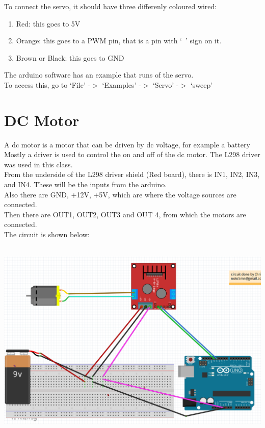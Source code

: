 \documentclass[14pt, oneside]{memoir}
\begin{document}
To connect the servo, it should have three differenly coloured
wired:
\begin{enumerate}
    \item Red: this goes to 5V
    \item Orange: this goes to a PWM pin, that is a pin with `~'
        sign on it.
    \item Brown or Black: this goes to GND
\end{enumerate}

The arduino software has an example that runs of the servo.
\\
To access this, go to `File' -$>$ `Examples' -$>$ `Servo' -$>$
`sweep'
\section*{DC Motor}
A dc motor is a motor that can be driven by dc voltage, for
example a battery
\\
Mostly a driver is used to control the on and off of the dc motor.
The L298 driver was used in this class.
\\
From the underside of the L298 driver shield (Red board), there is
IN1, IN2, IN3, and IN4. These will be the inputs from the arduino.
\\
Also there are GND, +12V, +5V, which are where the voltage sources
are connected.
\\
Then there are OUT1, OUT2, OUT3 and OUT 4, from which the motors
are connected.
\\
The circuit is shown below:

\includegraphics[width=6.49091in,height=3.82013in]{circuit_images/dc_motor_driver.png}
\end{document}
